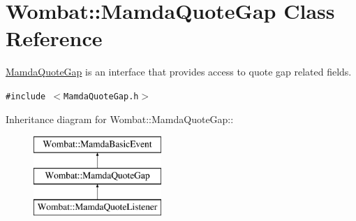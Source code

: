 \hypertarget{classWombat_1_1MamdaQuoteGap}{
\section{Wombat::Mamda\-Quote\-Gap Class Reference}
\label{classWombat_1_1MamdaQuoteGap}
}
\hyperlink{classWombat_1_1MamdaQuoteGap}{Mamda\-Quote\-Gap} is an interface that provides access to quote gap related fields.  


{\tt \#include $<$Mamda\-Quote\-Gap.h$>$}

Inheritance diagram for Wombat::Mamda\-Quote\-Gap::\begin{figure}[H]
\begin{center}
\leavevmode
\includegraphics[height=3cm]{classWombat_1_1MamdaQuoteGap}
\end{center}
\end{figure}
